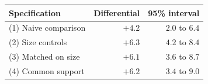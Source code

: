 \begin{tabular}{lrr}
\toprule
Specification & Differential & 95\% interval \\
\midrule
(1) Naive comparison & $+4.2$ & $2.0$ to $6.4$ \\
(2) Size controls & $+6.3$ & $4.2$ to $8.4$ \\
(3) Matched on size & $+6.1$ & $3.6$ to $8.7$ \\
(4) Common support & $+6.2$ & $3.4$ to $9.0$ \\
\bottomrule
\end{tabular}
